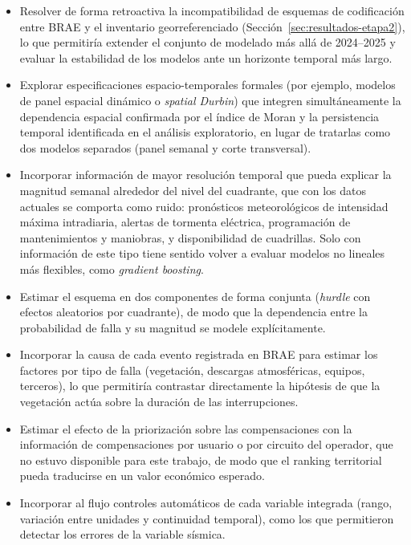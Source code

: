 \begin{itemize}
    \item Resolver de forma retroactiva la incompatibilidad de esquemas de codificación entre BRAE y el inventario georreferenciado (Sección~\ref{sec:resultados-etapa2}), lo que permitiría extender el conjunto de modelado más allá de 2024--2025 y evaluar la estabilidad de los modelos ante un horizonte temporal más largo.

    \item Explorar especificaciones espacio-temporales formales (por ejemplo, modelos de panel espacial dinámico o \emph{spatial Durbin}) que integren simultáneamente la dependencia espacial confirmada por el índice de Moran y la persistencia temporal identificada en el análisis exploratorio, en lugar de tratarlas como dos modelos separados (panel semanal y corte transversal).

    \item Incorporar información de mayor resolución temporal que pueda explicar la magnitud semanal alrededor del nivel del cuadrante, que con los datos actuales se comporta como ruido: pronósticos meteorológicos de intensidad máxima intradiaria, alertas de tormenta eléctrica, programación de mantenimientos y maniobras, y disponibilidad de cuadrillas. Solo con información de este tipo tiene sentido volver a evaluar modelos no lineales más flexibles, como \emph{gradient boosting}.

    \item Estimar el esquema en dos componentes de forma conjunta (\emph{hurdle} con efectos aleatorios por cuadrante), de modo que la dependencia entre la probabilidad de falla y su magnitud se modele explícitamente.

    \item Incorporar la causa de cada evento registrada en BRAE para estimar los factores por tipo de falla (vegetación, descargas atmosféricas, equipos, terceros), lo que permitiría contrastar directamente la hipótesis de que la vegetación actúa sobre la duración de las interrupciones.

    \item Estimar el efecto de la priorización sobre las compensaciones con la información de compensaciones por usuario o por circuito del operador, que no estuvo disponible para este trabajo, de modo que el ranking territorial pueda traducirse en un valor económico esperado.

    \item Incorporar al flujo controles automáticos de cada variable integrada (rango, variación entre unidades y continuidad temporal), como los que permitieron detectar los errores de la variable sísmica.


\end{itemize}
